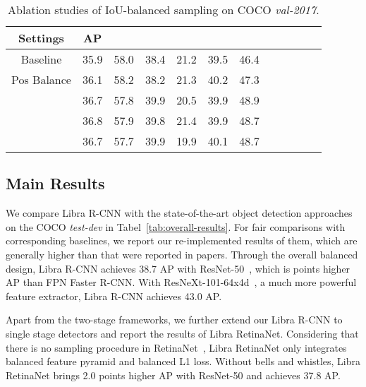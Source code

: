 \documentclass[10pt,twocolumn,letterpaper]{article}
\begin{document}
\begin{table}[htb]
	\centering
	\caption{Ablation studies of IoU-balanced sampling on COCO \emph{val-2017}.}
	\vspace{-5pt}
	\addtolength{\tabcolsep}{-2pt}
	\begin{tabular}{*{12}{c}}
		\toprule
		Settings    & AP   &  &  &  &  &  \\
		\midrule
		Baseline    & 35.9 & 58.0             & 38.4             & 21.2            & 39.5            & 46.4            \\
		\midrule
		Pos Balance & 36.1 & 58.2             & 38.2             & 21.3            & 40.2            & 47.3            \\
		     & 36.7 & 57.8             & 39.9             & 20.5            & 39.9            & 48.9            \\
		     & 36.8 & 57.9             & 39.8             & 21.4            & 39.9            & 48.7            \\
		     & 36.7 & 57.7             & 39.9             & 19.9            & 40.1            & 48.7            \\
		\bottomrule
	\end{tabular}
	\vspace{-10pt}
	\label{tab:iou}
\end{table}

\subsection{Main Results}
We compare Libra R-CNN with the state-of-the-art object detection approaches on the COCO \emph{test-dev} in Tabel~\ref{tab:overall-results}.
For fair comparisons with corresponding baselines, we report our re-implemented results of them, which are generally higher than that were reported in papers.
Through the overall balanced design, Libra R-CNN achieves 38.7 AP with ResNet-50~\cite{resnet}, which is  points higher AP than FPN Faster R-CNN.
With ResNeXt-101-64x4d~\cite{resnext}, a much more powerful feature extractor, Libra R-CNN achieves 43.0 AP.

Apart from the two-stage frameworks, we further extend our Libra R-CNN to single stage detectors and report the results of Libra RetinaNet.
Considering that there is no sampling procedure in RetinaNet~\cite{focalloss}, Libra RetinaNet only integrates balanced feature pyramid and balanced L1 loss.
Without bells and whistles, Libra RetinaNet brings 2.0 points higher AP with ResNet-50 and achieves 37.8 AP.
\end{document}
